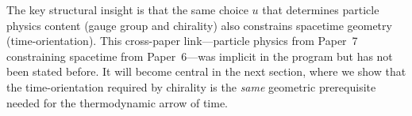 The key structural insight is that the same choice $u$ that
determines particle physics content (gauge group and chirality) also
constrains spacetime geometry (time-orientation).
This cross-paper link---particle physics from Paper~7 constraining
spacetime from Paper~6---was implicit in the program but has not
been stated before.  It will become central in the next section,
where we show that the time-orientation required by chirality is
the \emph{same} geometric prerequisite needed for the
thermodynamic arrow of time.
